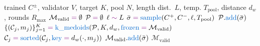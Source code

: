 \begin{algorithm}[h]
\caption{Clustering and medoid validation (Section~\ref{sub:clustering}).}
\label{alg:clustering}
\small
\begin{algorithmic}[1]

\Require trained $C^{\pm}$, validator $V$, target $K$, pool $N$, length dist.\ $L$, temp. $T_{\text{pool}}$, distance $d_w$, rounds $R_{\max}$
\State $\mathcal{M}_{\text{valid}} \op{=} \emptyset$
    \State $\mathcal{P} \op{=} \emptyset$
     
        \State $\ell \op{\sim} L$
        \State $\bar\sigma \op{=} \fn{sample}(C^+, C^-, \ell, T_{\text{pool}})$
            \State $\mathcal{P}.\fn{add}(\bar\sigma)$
        \EndIf
    \EndWhile
    \State $\{(\mathcal{C}_j, m_j)\}_{j=1}^{K} \op{=} \fn{k\_medoids}(\mathcal{P}, K, d_w, \fn{frozen}\op{=}\mathcal{M}_{\text{valid}})$ 
         \State {} \EndIf
        \State $\mathcal{C}_j \op{=} \fn{sorted}(\mathcal{C}_j, \fn{key}\op{=} d_w(\cdot, m_j))$
         
                \State $\mathcal{M}_{\text{valid}}.\fn{add}(\bar\sigma)$
                \State {}
            \EndIf
        \EndFor
    \EndFor
     \State {} \EndIf
\EndFor
\State {} $\mathcal{M}_{\text{valid}}$

\end{algorithmic}
\end{algorithm}
